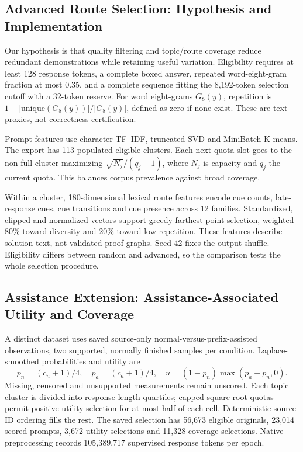 \documentclass[10pt,letterpaper]{article}
\begin{document}
\subsection{Advanced Route Selection: Hypothesis and Implementation}
Our hypothesis is that quality filtering and topic/route coverage reduce redundant demonstrations while retaining useful variation. Eligibility requires at least 128 response tokens, a complete boxed answer, repeated word-eight-gram fraction at most 0.35, and a complete sequence fitting the 8,192-token selection cutoff with a 32-token reserve. For word eight-grams $G_8(y)$, repetition is $1-|\mathrm{unique}(G_8(y))|/|G_8(y)|$, defined as zero if none exist. These are text proxies, not correctness certification.

Prompt features use character TF--IDF, truncated SVD and MiniBatch K-means. The export has 113 populated eligible clusters. Each next quota slot goes to the non-full cluster maximizing $\sqrt{N_j}/(q_j+1)$, where $N_j$ is capacity and $q_j$ the current quota. This balances corpus prevalence against broad coverage.

Within a cluster, 180-dimensional lexical route features encode cue counts, late-response cues, cue transitions and cue presence across 12 families. Standardized, clipped and normalized vectors support greedy farthest-point selection, weighted 80\% toward diversity and 20\% toward low repetition. These features describe solution text, not validated proof graphs. Seed 42 fixes the output shuffle. Eligibility differs between random and advanced, so the comparison tests the whole selection procedure.

\subsection{Assistance Extension: Assistance-Associated Utility and Coverage}
A distinct dataset uses saved source-only normal-versus-prefix-assisted observations, two supported, normally finished samples per condition. Laplace-smoothed probabilities and utility are
\[
 p_n=(c_n+1)/4,\quad p_a=(c_a+1)/4,\quad
 u=(1-p_n)\max(p_a-p_n,0).
\]
Missing, censored and unsupported measurements remain unscored. Each topic cluster is divided into response-length quartiles; capped square-root quotas permit positive-utility selection for at most half of each cell. Deterministic source-ID ordering fills the rest. The saved selection has 56,673 eligible originals, 23,014 scored prompts, 3,672 utility selections and 11,328 coverage selections. Native preprocessing records 105,389,717 supervised response tokens per epoch.
\end{document}
